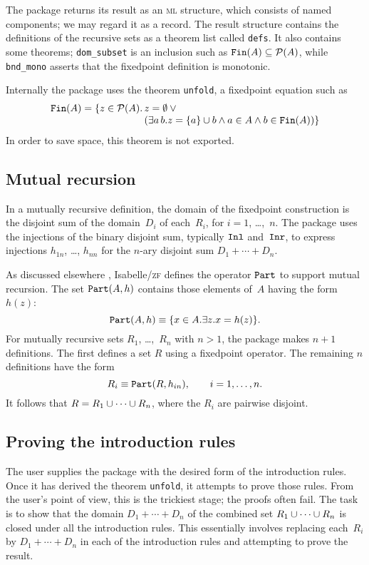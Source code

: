 \documentclass[12pt,a4paper]{article}
\newcommand\sbs{\subseteq}
\newcommand\pow{{\cal P}}
\newcommand\Inl{\hbox{\tt Inl}}
\newcommand\Inr{\hbox{\tt Inr}}
\newcommand\Part{\hbox{\tt Part}}
\newcommand\Fin{\hbox{\tt Fin}}
\begin{document}
The package returns its result as an \textsc{ml} structure, which consists of named
components; we may regard it as a record.  The result structure contains
the definitions of the recursive sets as a theorem list called {\tt defs}.
It also contains some theorems; {\tt dom\_subset} is an inclusion such as 
$\Fin(A)\sbs\pow(A)$, while {\tt bnd\_mono} asserts that the fixedpoint
definition is monotonic.

Internally the package uses the theorem {\tt unfold}, a fixedpoint equation
such as
\[
  \begin{array}[t]{r@{\,}l}
     \Fin(A) = \{z\in\pow(A). & z=\emptyset \disj{} \\
             &(\exists a\,b. z=\{a\}\un b\conj a\in A\conj b\in \Fin(A))\}
  \end{array}
\]
In order to save space, this theorem is not exported.  


\subsection{Mutual recursion} \label{mutual-sec}
In a mutually recursive definition, the domain of the fixedpoint construction
is the disjoint sum of the domain~$D_i$ of each~$R_i$, for $i=1$,
\ldots,~$n$.  The package uses the injections of the
binary disjoint sum, typically $\Inl$ and~$\Inr$, to express injections
$h_{1n}$, \ldots, $h_{nn}$ for the $n$-ary disjoint sum $D_1+\cdots+D_n$.

As discussed elsewhere \cite[\S4.5]{paulson-set-II}, Isabelle/\textsc{zf} defines the
operator $\Part$ to support mutual recursion.  The set $\Part(A,h)$
contains those elements of~$A$ having the form~$h(z)$:
\[ \Part(A,h)  \equiv \{x\in A. \exists z. x=h(z)\}. \]   
For mutually recursive sets $R_1$, \ldots,~$R_n$ with
$n>1$, the package makes $n+1$ definitions.  The first defines a set $R$ using
a fixedpoint operator. The remaining $n$ definitions have the form
\[ R_i \equiv \Part(R,h_{in}), \qquad i=1,\ldots, n.  \] 
It follows that $R=R_1\cup\cdots\cup R_n$, where the $R_i$ are pairwise disjoint.


\subsection{Proving the introduction rules}
The user supplies the package with the desired form of the introduction
rules.  Once it has derived the theorem {\tt unfold}, it attempts
to prove those rules.  From the user's point of view, this is the
trickiest stage; the proofs often fail.  The task is to show that the domain 
$D_1+\cdots+D_n$ of the combined set $R_1\cup\cdots\cup R_n$ is
closed under all the introduction rules.  This essentially involves replacing
each~$R_i$ by $D_1+\cdots+D_n$ in each of the introduction rules and
attempting to prove the result.
\end{document}
